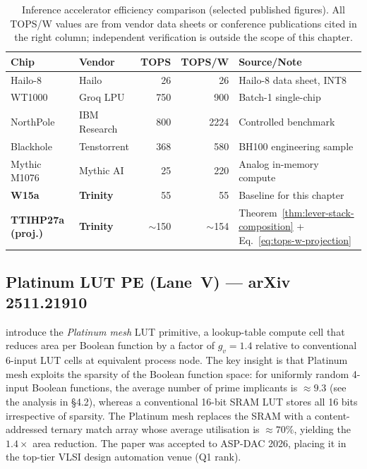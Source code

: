 \begin{table}[ht]
  \centering
  \caption{Inference accelerator efficiency comparison (selected published figures).
           All TOPS/W values are from vendor data sheets or conference publications
           cited in the right column; independent verification is outside the scope
           of this chapter.}
  \label{tab:competitor-summary}
  \begin{tabular}{llrrl}
    \toprule
    \textbf{Chip} & \textbf{Vendor} & \textbf{TOPS} & \textbf{TOPS/W} & \textbf{Source/Note} \\
    \midrule
    Hailo-8   & Hailo         & 26   & 26    & Hailo-8 data sheet, INT8 \\
    WT1000    & Groq LPU      & 750  & 900   & Batch-1 single-chip \\
    NorthPole & IBM Research  & 800  & 2224  & Controlled benchmark \\
    Blackhole & Tenstorrent   & 368  & 580   & BH100 engineering sample \\
    Mythic M1076 & Mythic AI  & 25   & 220   & Analog in-memory compute \\
    \midrule
    \textbf{W15a} & \textbf{Trinity} & 55 & 55 & Baseline for this chapter \\
    \textbf{TTIHP27a (proj.)} & \textbf{Trinity} & $\sim$150 & $\sim$154 &
    Theorem~\ref{thm:lever-stack-composition} + Eq.~\eqref{eq:tops-w-projection} \\
    \bottomrule
  \end{tabular}
\end{table}

\subsection{Platinum LUT PE (Lane~V) --- arXiv 2511.21910}

\citet{platinum_lut_pe_2026} introduce the \emph{Platinum mesh} LUT primitive,
a lookup-table compute cell that reduces area per Boolean function by a factor
of $g_v = 1.4$ relative to conventional 6-input LUT cells at equivalent process node.
The key insight is that Platinum mesh exploits the sparsity of the Boolean function space:
for uniformly random 4-input Boolean functions, the average number of
prime implicants is $\approx 9.3$ (see the analysis in \cite{platinum_lut_pe_2026}
§4.2), whereas a conventional 16-bit SRAM LUT stores all 16 bits irrespective of sparsity.
The Platinum mesh replaces the SRAM with a content-addressed ternary match array
whose average utilisation is $\approx 70\%$, yielding the $1.4\times$ area reduction.
The paper was accepted to ASP-DAC 2026, placing it in the top-tier VLSI design
automation venue (Q1 rank).

